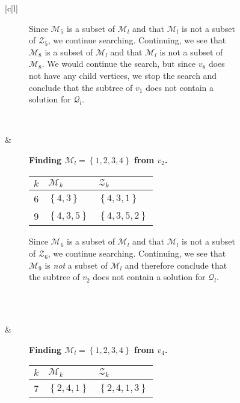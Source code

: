 \begin{figure}[H]
\begin{tabular}[t]{|c|l|}
\begin{subfigure}[b]{0.64\textwidth}
        Since $\mathcal{M}_5$ is a subset of $\mathcal{M}_l$ and that
        $\mathcal{M}_l$ is not a subset of $\mathcal{Z}_5$, we continue
        searching. Continuing, we see that $\mathcal{M}_8$ is a subset of
        $\mathcal{M}_l$ and that $\mathcal{M}_l$ is not a subset of
        $\mathcal{M}_8$. We would continue the search, but since
        $v_8$ does not have any child vertices, we stop the search
        and conclude that the subtree of $v_1$ does not contain
        a solution for $\mathcal{Q}_l$.
    \end{subfigure}
    \\ \hline
    \begin{subfigure}[b]{0.35\textwidth}
        \centering
        
    \end{subfigure}
    & 
    \begin{subfigure}[b]{0.64\textwidth}
        \textbf{Finding $\mathcal{M}_l = \left\{{1,2,3,4}\right\}$ from $v_2$.} \\
        \begin{tabular}{rll}
            $k$ & $\mathcal{M}_k$            & $\mathcal{Z}_k$ \\ \hline
            6        & $\left\{{4,3}\right\}$     & $\left\{{4,3,1}\right\}$ \\ 
            9        & $\left\{{4,3,5}\right\}$   & $\left\{{4,3,5,2}\right\}$ \\ 
        \end{tabular}

        Since $\mathcal{M}_6$ is a subset of $\mathcal{M}_l$ and that
        $\mathcal{M}_l$ is not a subset of $\mathcal{Z}_6$, we continue
        searching. Continuing, we see that $\mathcal{M}_9$ is \emph{not} a
        subset of $\mathcal{M}_l$ and therefore conclude that the subtree of
        $v_2$ does not contain a solution for $\mathcal{Q}_l$.
        \\
        \\
    \end{subfigure}
    \\ \hline
    \begin{subfigure}[b]{0.35\textwidth}
        \centering
        
    \end{subfigure}
    & 
    \begin{subfigure}[b]{0.64\textwidth}
        \textbf{Finding $\mathcal{M}_l = \left\{{1,2,3,4}\right\}$ from $v_4$.} \\
        \begin{tabular}{rll}
            $k$ & $\mathcal{M}_k$            & $\mathcal{Z}_k$ \\ \hline
            7        & $\left\{{2,4,1}\right\}$   & $\left\{{2,4,1,3}\right\}$ \\ 
        \end{tabular}


\end{subfigure}
\end{tabular}
\end{figure}
